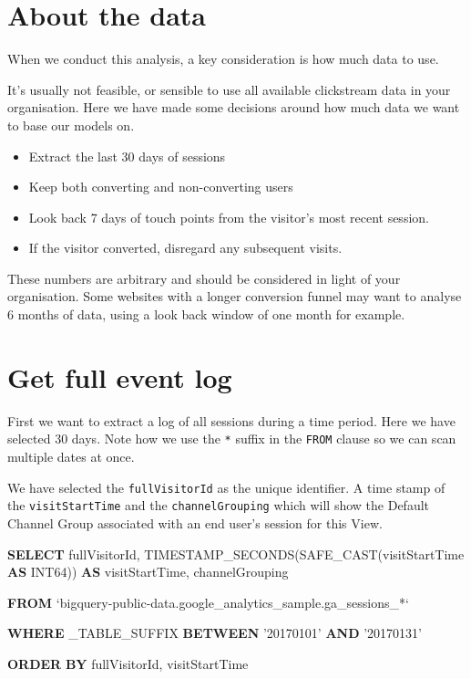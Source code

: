 \documentclass[]{book}
\newenvironment{Shaded}{\begin{snugshade}}{\end{snugshade}}
\newcommand{\KeywordTok}[1]{\textcolor[rgb]{0.13,0.29,0.53}{\textbf{#1}}}
\newcommand{\StringTok}[1]{\textcolor[rgb]{0.31,0.60,0.02}{#1}}
\newcommand{\NormalTok}[1]{#1}
\providecommand{\tightlist}{%
  \setlength{\itemsep}{0pt}\setlength{\parskip}{0pt}}
\begin{document}
\hypertarget{about-the-data}{\section{About the
data}\label{about-the-data}}

When we conduct this analysis, a key consideration is how much data to
use.

It's usually not feasible, or sensible to use all available clickstream
data in your organisation. Here we have made some decisions around how
much data we want to base our models on.

\begin{itemize}
\tightlist
\item
  Extract the last 30 days of sessions\\
\item
  Keep both converting and non-converting users\\
\item
  Look back 7 days of touch points from the visitor's most recent
  session.\\
\item
  If the visitor converted, disregard any subsequent visits.
\end{itemize}

These numbers are arbitrary and should be considered in light of your
organisation. Some websites with a longer conversion funnel may want to
analyse 6 months of data, using a look back window of one month for
example.

\section{Get full event log}\label{get-full-event-log}

First we want to extract a log of all sessions during a time period.
Here we have selected 30 days. Note how we use the \texttt{*} suffix in
the \texttt{FROM} clause so we can scan multiple dates at once.

We have selected the \texttt{fullVisitorId} as the unique identifier. A
time stamp of the \texttt{visitStartTime} and the
\texttt{channelGrouping} which will show the Default Channel Group
associated with an end user's session for this View.

\begin{Shaded}
\begin{Highlighting}[]
   \KeywordTok{SELECT}\NormalTok{ fullVisitorId, }
\NormalTok{          TIMESTAMP_SECONDS(SAFE_CAST(visitStartTime }\KeywordTok{AS}\NormalTok{ INT64))  }\KeywordTok{AS}\NormalTok{ visitStartTime,  }
\NormalTok{          channelGrouping}

    \KeywordTok{FROM}\NormalTok{ `bigquery-public-data.google_analytics_sample.ga_sessions_*`}

    \KeywordTok{WHERE}\NormalTok{ _TABLE_SUFFIX }\KeywordTok{BETWEEN} \StringTok{'20170101'} \KeywordTok{AND} \StringTok{'20170131'}

    \KeywordTok{ORDER} \KeywordTok{BY}\NormalTok{ fullVisitorId, visitStartTime}
\end{Highlighting}
\end{Shaded}
\end{document}

